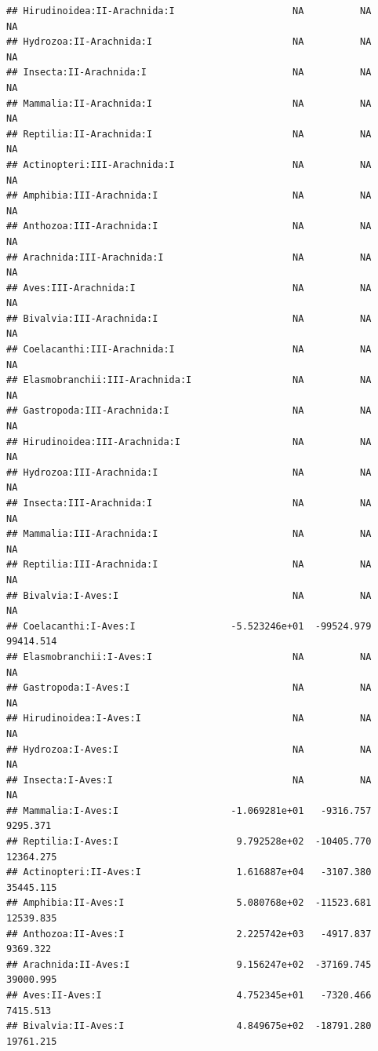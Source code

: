 \documentclass[
  12pt,
]{article}
\begin{document}
\begin{verbatim}
## Hirudinoidea:II-Arachnida:I                     NA          NA          NA
## Hydrozoa:II-Arachnida:I                         NA          NA          NA
## Insecta:II-Arachnida:I                          NA          NA          NA
## Mammalia:II-Arachnida:I                         NA          NA          NA
## Reptilia:II-Arachnida:I                         NA          NA          NA
## Actinopteri:III-Arachnida:I                     NA          NA          NA
## Amphibia:III-Arachnida:I                        NA          NA          NA
## Anthozoa:III-Arachnida:I                        NA          NA          NA
## Arachnida:III-Arachnida:I                       NA          NA          NA
## Aves:III-Arachnida:I                            NA          NA          NA
## Bivalvia:III-Arachnida:I                        NA          NA          NA
## Coelacanthi:III-Arachnida:I                     NA          NA          NA
## Elasmobranchii:III-Arachnida:I                  NA          NA          NA
## Gastropoda:III-Arachnida:I                      NA          NA          NA
## Hirudinoidea:III-Arachnida:I                    NA          NA          NA
## Hydrozoa:III-Arachnida:I                        NA          NA          NA
## Insecta:III-Arachnida:I                         NA          NA          NA
## Mammalia:III-Arachnida:I                        NA          NA          NA
## Reptilia:III-Arachnida:I                        NA          NA          NA
## Bivalvia:I-Aves:I                               NA          NA          NA
## Coelacanthi:I-Aves:I                 -5.523246e+01  -99524.979   99414.514
## Elasmobranchii:I-Aves:I                         NA          NA          NA
## Gastropoda:I-Aves:I                             NA          NA          NA
## Hirudinoidea:I-Aves:I                           NA          NA          NA
## Hydrozoa:I-Aves:I                               NA          NA          NA
## Insecta:I-Aves:I                                NA          NA          NA
## Mammalia:I-Aves:I                    -1.069281e+01   -9316.757    9295.371
## Reptilia:I-Aves:I                     9.792528e+02  -10405.770   12364.275
## Actinopteri:II-Aves:I                 1.616887e+04   -3107.380   35445.115
## Amphibia:II-Aves:I                    5.080768e+02  -11523.681   12539.835
## Anthozoa:II-Aves:I                    2.225742e+03   -4917.837    9369.322
## Arachnida:II-Aves:I                   9.156247e+02  -37169.745   39000.995
## Aves:II-Aves:I                        4.752345e+01   -7320.466    7415.513
## Bivalvia:II-Aves:I                    4.849675e+02  -18791.280   19761.215

\end{verbatim}
\end{document}
